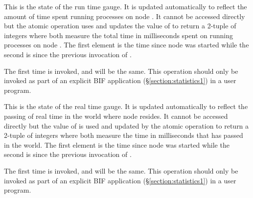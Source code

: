 \begin{Lentry}
\item[\T{runtime[\Z{N}]}]
This is the state of the run time gauge.  It is updated automatically to reflect the
amount of time spent running processes on node .
It cannot be accessed directly
but the atomic operation  uses and updates
the value of 
to return a 2-tuple  of integers where both
measure the total time in milliseconds spent on running processes on node .
The first element is the time since node  was started while the second is
since the previous invocation of .

The first time  is invoked,
 and  will be the same.
This operation should only be invoked as part of an explicit
BIF application 
(\S\ref{section:statistics1}) in a user program.

\item[\T{wall_clock[\Z{N}]}]
This is the state of the real time gauge.  It is updated automatically
to reflect the passing of real time in the world where node 
resides.  It cannot be accessed directly but the value of
 is used and updated by the atomic operation
 to return a 2-tuple
 of integers where both measure the
time in milliseconds that has passed in the world.  The first element
is the time since node  was started while the second is since
the previous invocation of .

The first time  is invoked, 
and  will be the same.  This operation should only be
invoked as part of an explicit BIF application
 (\S\ref{section:statistics1}) in a user program.
\end{Lentry}
